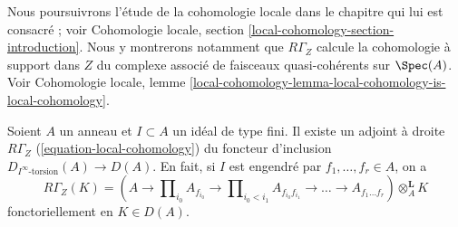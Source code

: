\medskip\noindent
Nous poursuivrons l'étude de la cohomologie locale dans le chapitre
qui lui est consacré ; voir Cohomologie locale, section \ref{local-cohomology-section-introduction}.
Nous y montrerons notamment que $R\Gamma_Z$ calcule la cohomologie
à support dans $Z$ du complexe associé de faisceaux quasi-cohérents
sur $\Spec(A)$. Voir Cohomologie locale, lemme \ref{local-cohomology-lemma-local-cohomology-is-local-cohomology}.


\begin{lemma}
\label{lemma-local-cohomology-adjoint}
Soient $A$ un anneau et $I \subset A$ un idéal de type fini.
Il existe un adjoint à droite $R\Gamma_Z$ (\ref{equation-local-cohomology})
du foncteur d'inclusion $D_{I^\infty\text{-torsion}}(A) \to D(A)$.
En fait, si $I$ est engendré par $f_1, \ldots, f_r \in A$, on a
$$
R\Gamma_Z(K) =
(A \to \prod\nolimits_{i_0} A_{f_{i_0}} \to
\prod\nolimits_{i_0 < i_1} A_{f_{i_0}f_{i_1}}
\to \ldots \to A_{f_1\ldots f_r}) \otimes_A^\mathbf{L} K
$$
fonctoriellement en $K \in D(A)$.
\end{lemma}

